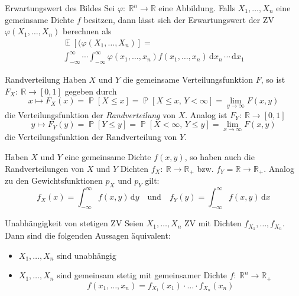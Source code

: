 \documentclass[a4paper,10pt]{article}
\def\R{\mathbb{R}}
\renewcommand{\P}{\operatorname{\mathbb{P}}}
\DeclareMathOperator{\E}{\mathbb{E}}
\numberwithin{equation}{section}
\begin{document}
\begin{mainbox}{Erwartungswert des Bildes}
    Sei \( \varphi: \: \R^n \to \R \) eine Abbildung. Falls \( X_1, \dots, X_n \) eine gemeinsame Dichte \( f \) besitzen, dann lässt sich der Erwartungswert der ZV \( \varphi(X_1, \dots, X_n) \) berechnen als
    \begin{multline*}
        \E[(\varphi(X_1, \dots, X_n)] = \\
        \int_{-\infty}^{\infty} \dotsi \int_{-\infty}^\infty \varphi(x_1, \dots, x_n) f(x_1, \dots, x_n) \, \mathrm{d}x_n \, \dotsi \, \mathrm{d}x_1
    \end{multline*}
\end{mainbox}

\begin{mainbox}{Randverteilung}
    Haben \( X \) und \( Y \) die gemeinsame Verteilungsfunktion \( F \), so ist \( F_X: \: \R \to [0, 1] \) gegeben durch
    \[
        x \mapsto F_X(x) = \P[X \leq x] = \P[X \leq x, \, Y < \infty] = \lim_{y \to \infty} F(x, y)
    \]
    die Verteilungsfunktion der \emph{Randverteilung} von \( X \). Analog ist \( F_Y: \: \R \to [0, 1] \)
    \[
        y \mapsto F_Y(y) = \P[Y \leq y] = \P[X < \infty, \, Y \leq y] = \lim_{x \to \infty} F(x, y)
    \]
    die Verteilungsfunktion der Randverteilung von \( Y \).
\end{mainbox}

Haben \( X \) und \( Y \) eine gemeinsame Dichte \( f(x, y) \), so haben auch die Randverteilungen von \( X \) und \( Y \) Dichten \( f_X: \: \R \to \R_+ \) bzw. \( f_Y = \R \to \R_+ \). Analog zu den Gewichtsfunktionen \( p_X \) und \( p_Y \) gilt:
\[
    f_X(x) = \int_{-\infty}^\infty f(x, y) \, \mathrm{d}y \quad \text{und} \quad f_Y(y) = \int_{-\infty}^\infty f(x, y) \, \mathrm{d}x
\]

\begin{mainbox}{Unabhängigkeit von stetigen ZV}
    Seien \( X_1, \dots, X_n \) ZV mit Dichten \( f_{X_1}, \dots, f_{X_n} \). Dann sind die folgenden Aussagen äquivalent:
    \begin{itemize}
        \item \( X_1, \dots, X_n \) sind unabhängig
        \item \( X_1, \dots, X_n \) sind gemeinsam stetig mit gemeinsamer Dichte \( f: \: \R^n \to \R_+ \)
        \[
            f(x_1, \dots, x_n) = f_{X_1}(x_1) \cdot \dots \cdot f_{X_n}(x_n)
        \]
    \end{itemize}
\end{mainbox}
\end{document}
